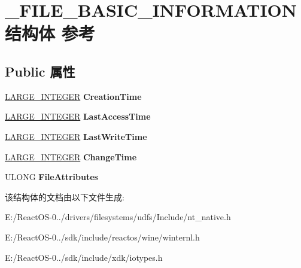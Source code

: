 \hypertarget{struct___f_i_l_e___b_a_s_i_c___i_n_f_o_r_m_a_t_i_o_n}{}\section{\+\_\+\+F\+I\+L\+E\+\_\+\+B\+A\+S\+I\+C\+\_\+\+I\+N\+F\+O\+R\+M\+A\+T\+I\+O\+N结构体 参考}
\label{struct___f_i_l_e___b_a_s_i_c___i_n_f_o_r_m_a_t_i_o_n}
\subsection*{Public 属性}
\begin{DoxyCompactItemize}
\item 
\mbox{\label{struct___f_i_l_e___b_a_s_i_c___i_n_f_o_r_m_a_t_i_o_n_a3248793065da195cfb8943906d5c4174}} 
\hyperlink{union___l_a_r_g_e___i_n_t_e_g_e_r}{L\+A\+R\+G\+E\+\_\+\+I\+N\+T\+E\+G\+ER} {\bfseries Creation\+Time}
\item 
\mbox{\label{struct___f_i_l_e___b_a_s_i_c___i_n_f_o_r_m_a_t_i_o_n_afa5726e7e88e909249a222d1992d9666}} 
\hyperlink{union___l_a_r_g_e___i_n_t_e_g_e_r}{L\+A\+R\+G\+E\+\_\+\+I\+N\+T\+E\+G\+ER} {\bfseries Last\+Access\+Time}
\item 
\mbox{\label{struct___f_i_l_e___b_a_s_i_c___i_n_f_o_r_m_a_t_i_o_n_a2e68af7bccc7317606ca0bb3cc0b8db1}} 
\hyperlink{union___l_a_r_g_e___i_n_t_e_g_e_r}{L\+A\+R\+G\+E\+\_\+\+I\+N\+T\+E\+G\+ER} {\bfseries Last\+Write\+Time}
\item 
\mbox{\label{struct___f_i_l_e___b_a_s_i_c___i_n_f_o_r_m_a_t_i_o_n_a3f3cbc57ec45b93ce1d5afedc436d6e2}} 
\hyperlink{union___l_a_r_g_e___i_n_t_e_g_e_r}{L\+A\+R\+G\+E\+\_\+\+I\+N\+T\+E\+G\+ER} {\bfseries Change\+Time}
\item 
\mbox{\label{struct___f_i_l_e___b_a_s_i_c___i_n_f_o_r_m_a_t_i_o_n_a9f3f9218a9376406878eeee19bf2bfa2}} 
U\+L\+O\+NG {\bfseries File\+Attributes}
\end{DoxyCompactItemize}


该结构体的文档由以下文件生成\+:\begin{DoxyCompactItemize}
\item 
E\+:/\+React\+O\+S-\/0../drivers/filesystems/udfs/\+Include/nt\+\_\+native.\+h\item 
E\+:/\+React\+O\+S-\/0../sdk/include/reactos/wine/winternl.\+h\item 
E\+:/\+React\+O\+S-\/0../sdk/include/xdk/iotypes.\+h\end{DoxyCompactItemize}
